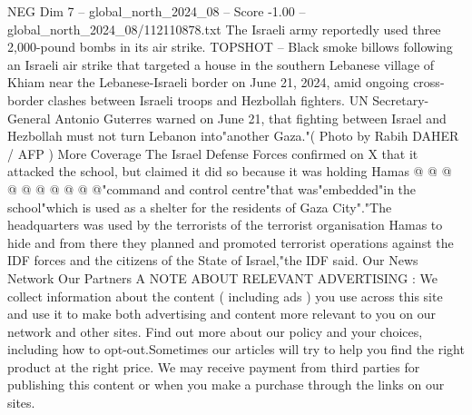 \begin{textsample}{NEG Dim 7 – global\_north\_2024\_08 – Score -1.00 – global\_north\_2024\_08/112110878.txt}
The Israeli army reportedly used three 2,000-pound bombs in its air strike.
TOPSHOT -- Black smoke billows following an Israeli air strike that targeted a house in the southern Lebanese village of Khiam near the Lebanese-Israeli border on June 21, 2024, amid ongoing cross-border clashes between Israeli troops and Hezbollah fighters.
UN Secretary-General Antonio Guterres warned on June 21, that fighting between Israel and Hezbollah must not turn Lebanon into"another Gaza."( Photo by Rabih DAHER / AFP ) More Coverage The Israel Defense Forces confirmed on X that it attacked the school, but claimed it did so because it was holding Hamas @ @ @ @ @ @ @ @ @ @"command and control centre"that was"embedded"in the school"which is used as a shelter for the residents of Gaza City"."The headquarters was used by the terrorists of the terrorist organisation Hamas to hide and from there they planned and promoted terrorist operations against the IDF forces and the citizens of the State of Israel,"the IDF said.
Our News Network Our Partners A NOTE ABOUT RELEVANT ADVERTISING : We collect information about the content ( including ads ) you use across this site and use it to make both advertising and content more relevant to you on our network and other sites.
Find out more about our policy and your choices, including how to opt-out.Sometimes our articles will try to help you find the right product at the right price.
We may receive payment from third parties for publishing this content or when you make a purchase through the links on our sites.

\end{textsample}
